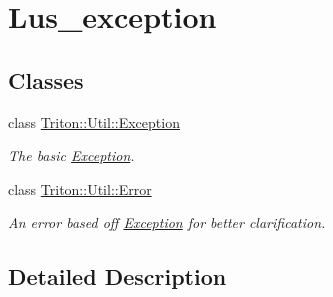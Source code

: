 \hypertarget{group__lus__exception}{}\section{Lus\+\_\+exception}
\label{group__lus__exception}
\subsection*{Classes}
\begin{DoxyCompactItemize}
\item 
class \hyperlink{class_triton_1_1_util_1_1_exception}{Triton\+::\+Util\+::\+Exception}
\begin{DoxyCompactList}\small\item\em The basic \hyperlink{class_triton_1_1_util_1_1_exception}{Exception}. \end{DoxyCompactList}\item 
class \hyperlink{class_triton_1_1_util_1_1_error}{Triton\+::\+Util\+::\+Error}
\begin{DoxyCompactList}\small\item\em An error based off \hyperlink{class_triton_1_1_util_1_1_exception}{Exception} for better clarification. \end{DoxyCompactList}\end{DoxyCompactItemize}


\subsection{Detailed Description}
